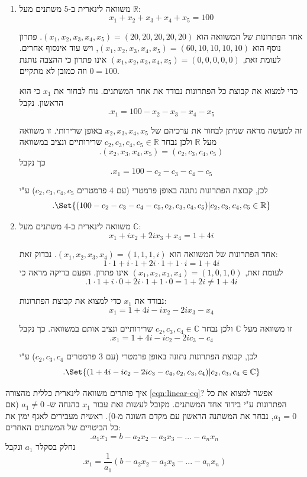 \documentclass[
  hebrew,
  12pt,
  a4paper,
  oneside]{book}
\theoremstyle{definition}
\theoremstyle{remark}
\theoremstyle{plain}
\theoremstyle{remark}
\begin{document}
\begin{example}

~

\begin{enumerate}
\def\labelenumi{\arabic{enumi}.}
\item
  משוואה לינארית ב-\(5\) משתנים מעל \(\mathbb R\):
  \[x_1+x_2+x_3+x_4+x_5=100\]

  אחד הפתרונות של המשוואה הוא
  \((x_1,x_2,x_3,x_4,x_5)=(20,20,20,20,20)\). פתרון נוסף הוא
  \((x_1,x_2,x_3,x_4,x_5)=(60,10,10,10,10)\), ויש עוד אינסוף אחרים.
  לעומת זאת, \((x_1,x_2,x_3,x_4,x_5)=(0,0,0,0,0)\) אינו פתרון כי ההצבה
  נותנת \(0=100\) וזה כמובן לא מתקיים.

  כדי למצוא את קבוצת כל הפתרונות נבודד את אחד המשתנים. נוח לבחור את
  \(x_1\) כי הוא הראשון. נקבל \[.x_1=100-x_2-x_3-x_4-x_5\]

  זה למעשה מראה שניתן לבחור את ערכיהם של \(x_2,x_3,x_4,x_5\) באופן
  שרירותי. זו משוואה מעל \(\mathbb R\) ולכן נבחר
  \(c_2,c_3,c_4,c_5\in\mathbb R\) שרירותיים ונציב במשוואה
  \[.(x_2,x_3,x_4,x_5)=(c_2,c_3,c_4,c_5)\] כך נקבל
  \[.x_1=100-c_2-c_3-c_4-c_5\]

  לכן, קבוצת הפתרונות נתונה באופן פרמטרי (עם \(4\) פרמטרים
  \(c_2,c_3,c_4,c_5\)) ע"י
  \[.\Set{(100-c_2-c_3-c_4-c_5,c_2,c_3,c_4,c_5)|c_2,c_3,c_4,c_5\in\mathbb R}\]
\item
  משוואה לינארית ב-\(4\) משתנים מעל \(\mathbb C\):
  \[x_1+ix_2+2ix_3+x_4=1+4i\]

  אחד הפתרונות של המשוואה הוא \((x_1,x_2,x_3,x_4)=(1,1,1,i)\). נבדוק
  זאת: \[1\cdot 1+i\cdot 1+2i\cdot 1+1\cdot i=1+4i\] לעומת זאת,
  \((x_1,x_2,x_3,x_4)=(1,0,1,0)\) אינו פתרון. הפעם בדיקה מראה כי
  \[.1\cdot 1+i\cdot 0+2i\cdot 1+1\cdot 0=1+2i\neq1+4i\]

  נבודד את \(x_1\) כדי למצוא את קבוצת הפתרונות:
  \[x_1=1+4i-ix_2-2ix_3-x_4\]

  זו משוואה מעל \(\mathbb C\) ולכן נבחר \(c_2,c_3,c_4\in\mathbb C\)
  שרירותיים ונציב אותם במשוואה. כך נקבל \[.x_1=1+4i-ic_2-2ic_3-c_4\]

  לכן, קבוצת הפתרונות נתונה באופן פרמטרי (עם \(3\) פרמטרים
  \(c_2,c_3,c_4\)) ע"י
  \[.\Set{(1+4i-ic_2-2ic_3-c_4,c_2,c_3,c_4)|c_2,c_3,c_4\in\mathbb C}\]
\end{enumerate}

\end{example}

איך פותרים משוואה לינארית כללית מהצורה \ref{eqn:linear-eq}? אפשר למצוא
את כל הפתרונות ע"י בידוד אחד המשתנים. מקובל לעשות זאת עבור \(x_1\) בהנחה
ש- \(a_1\neq0\) (אם \(a_1=0\), נבחר את המשתנה הראשון עם מקדם השונה
מ-\(0\)). ראשית מעבירים לאגף ימין את כל הביטויים של המשתנים האחרים:
\[.a_1x_1=b-a_2x_2-a_3x_3-...-a_nx_n\] נחלק בסקלר \(a_1\) ונקבל
\[.x_1=\frac{1}{a_1}(b-a_2x_2-a_3x_3-...-a_nx_n)\]
\end{document}
